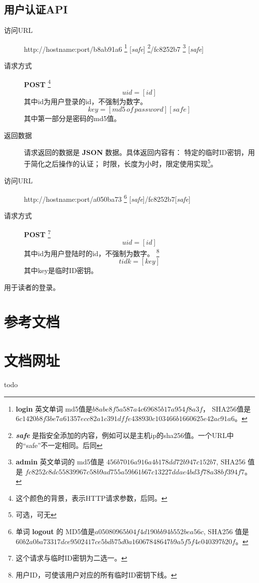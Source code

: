 \documentclass[UTF8]{ctexart}
\begin{document}
    \subsection{用户认证API}
    \begin{description}
        \item[访问URL] http://hostname:port/b8ab91a6
        \footnote{
            \textbf{login} 英文单词 md5值是$b8abe8f5a587a4c69685b17a954f8a3f$，
            SHA256值是 
            $6c1420b8f3be7a61357ecc82a1c391dffe438930c103466b1660625e42ac91a6$。
        }
        [\textit{safe}]
        \footnote{\textit{\textbf{safe}} 是指安全添加的内容，例如可以是主机ip的sha256值。一个URL中的“safe”不一定相同。后同}/fc8252b7
        \footnote{
            \textbf{admin} 英文单词的
            md5值是 $456b7016a916a4b178dd72b947c152b7 $,
            SHA256 值是
            $fc8252c8dc55839967c58b9ad755a59b61b67c13227ddae4bd3f78a38bf394f7$。
        }
        [\textit{safe}]
        \item[请求方式] \textbf{POST}
        \footnote{这个颜色的背景，表示HTTP请求参数，后同。}
        $$uid=[id]$$
        其中id为用户登录的id，不强制为数字。
         $$key=[md5\, of\, password][safe]$$
         其中第一部分是密码的md5值。
        \item[返回数据]请求返回的数据是 \textbf{JSON} 数据。具体返回内容有：
        特定的临时ID密钥，用于简化之后操作的认证；
        时限，长度为小时，限定使用实现\footnote{可选，可无}。
    \end{description}
    \begin{description}
        \item[访问URL] http://hostname:port/a050ba73
        \footnote{
            单词 \textbf{logout} 的
            MD5值是$a05080965b04f4d190bb94b552bea56c $,
            SHA256 值是
            $60b2a0ba73317dce9502417ce5bdb75d0a16067848647b9a5f5f4e040397b20f$。
        }
        [\textit{safe}]/fc8252b7[\textit{safe}]
        \item[请求方式] \textbf{POST}
        \footnote{这个请求与临时ID密钥为二选一。}
        $$uid=[id]$$
        其中id为用户登陆时的id，不强制为数字。
        \footnote{用户ID，可使该用户对应的所有临时ID密钥下线。}
        $$tidk=[key]$$
        其中key是临时ID密钥。
    \end{description}
		用于读者的登录。
		\begin{description}
		\item[]
		\end{description}
    \newpage
    \begin{appendices}
    \section{参考文档}
    \section{文档网址}
    todo 
    \end{appendices}
    
\end{document}

